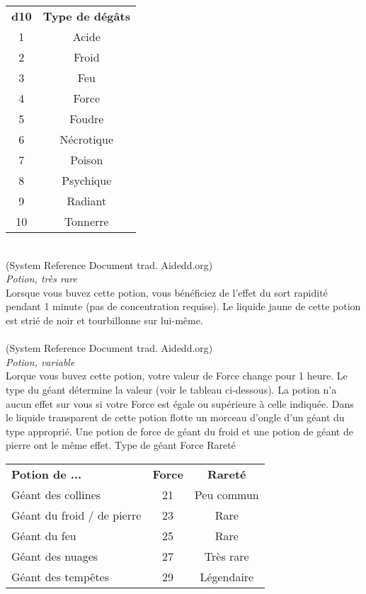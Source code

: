 \begin{center}
\setlength{\tabcolsep}{4pt}
\begin{tabular}{cc}
\bf d10 & \bf Type de dégâts \\
   \rowcolor{LightCyan}
1       & Acide              \\
2       & Froid              \\
   \rowcolor{LightCyan}
3       & Feu                \\
4       & Force              \\
   \rowcolor{LightCyan}
5       & Foudre             \\
6       & Nécrotique         \\
   \rowcolor{LightCyan}
7       & Poison             \\
8       & Psychique          \\
   \rowcolor{LightCyan}
9       & Radiant            \\
10      & Tonnerre           \\
\end{tabular}
\end{center}

\\
{\small (System Reference Document trad. Aidedd.org)}\\
{\small \it Potion, très rare}\\
Lorsque vous buvez cette potion, vous bénéficiez de l'effet du sort rapidité pendant 1 minute (pas de concentration requise). Le liquide jaune de cette potion est strié de noir et tourbillonne sur lui-même. \\

\\
{\small (System Reference Document trad. Aidedd.org)}\\
{\small \it Potion, variable}\\
Lorque vous buvez cette potion, votre valeur de Force change pour 1 heure. Le type du géant détermine la valeur (voir le tableau ci-dessous). La potion n'a aucun effet sur vous si votre Force est égale ou supérieure à celle indiquée.
Dans le liquide transparent de cette potion flotte un morceau d'ongle d'un géant du type approprié. Une potion de force de géant du froid et une potion de géant de pierre ont le même effet.
Type de géant Force Rareté
\begin{center}
\setlength{\tabcolsep}{4pt}
\begin{tabular}{lcc}
\bf Potion de ...  & \bf Force & \bf Rareté \\
   \rowcolor{LightCyan}
Géant des collines & 21 & Peu commun \\
Géant du froid / de pierre & 23 & Rare \\
   \rowcolor{LightCyan}
Géant du feu & 25 & Rare \\
Géant des nuages & 27 & Très rare \\
   \rowcolor{LightCyan}
Géant des tempêtes & 29 & Légendaire \\
\end{tabular}
\end{center}
\pagebreak

